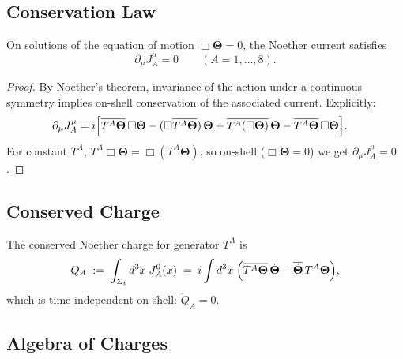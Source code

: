 \subsection{Conservation Law}

\begin{theorem}
  \label{thm:current_conservation}
  On solutions of the equation of motion $\Box\boldsymbol{\Theta}=0$, the
  Noether current satisfies
  \begin{equation}
    \label{eq:current_conservation}
    \partial_\mu J_A^\mu = 0
    \qquad (A=1,\ldots,8).
  \end{equation}
\end{theorem}

\begin{proof}
  By Noether's theorem, invariance of the action under a continuous symmetry
  implies on-shell conservation of the associated current.  Explicitly:
  \begin{align}
    \partial_\mu J_A^\mu
    &= i\Bigl[
        \overline{T^A\boldsymbol{\Theta}}\,\Box\boldsymbol{\Theta}
        - (\Box\overline{T^A\boldsymbol{\Theta}})\,\boldsymbol{\Theta}
        + \overline{T^A(\Box\boldsymbol{\Theta})}\,\boldsymbol{\Theta}
        - \overline{T^A\boldsymbol{\Theta}}\,\Box\boldsymbol{\Theta}
      \Bigr].
  \end{align}
  For constant $T^A$, $T^A\Box\boldsymbol{\Theta} = \Box(T^A\boldsymbol{\Theta})$,
  so on-shell ($\Box\boldsymbol{\Theta}=0$) we get $\partial_\mu J_A^\mu=0$.
\end{proof}

\subsection{Conserved Charge}

The conserved Noether charge for generator $T^A$ is
\begin{equation}
  \label{eq:noether_charge}
  Q_A \;:=\; \int_{\Sigma_t} d^3x\; J_A^0(x)
  \;=\; i\int d^3x\;
    \Bigl(
      \overline{T^A\boldsymbol{\Theta}}\,\dot{\boldsymbol{\Theta}}
      - \overline{\dot{\boldsymbol{\Theta}}}\,T^A\boldsymbol{\Theta}
    \Bigr),
\end{equation}
which is time-independent on-shell: $\dot Q_A = 0$.

\subsection{Algebra of Charges}

